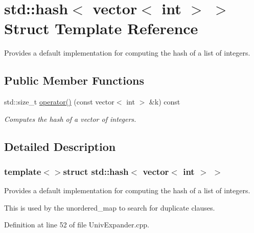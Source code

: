 \hypertarget{structstd_1_1hash_3_01vector_3_01int_01_4_01_4}{\section{std\-:\-:hash$<$ vector$<$ int $>$ $>$ Struct Template Reference}
\label{structstd_1_1hash_3_01vector_3_01int_01_4_01_4}
}


Provides a default implementation for computing the hash of a list of integers.  


\subsection*{Public Member Functions}
\begin{DoxyCompactItemize}
\item 
std\-::size\-\_\-t \hyperlink{structstd_1_1hash_3_01vector_3_01int_01_4_01_4_a6305d2599961ec2f66a3d29907edcb9b}{operator()} (const vector$<$ int $>$ \&k) const 
\begin{DoxyCompactList}\small\item\em Computes the hash of a vector of integers. \end{DoxyCompactList}\end{DoxyCompactItemize}


\subsection{Detailed Description}
\subsubsection*{template$<$$>$struct std\-::hash$<$ vector$<$ int $>$ $>$}

Provides a default implementation for computing the hash of a list of integers. 

This is used by the unordered\-\_\-map to search for duplicate clauses. 

Definition at line 52 of file Univ\-Expander.\-cpp.



